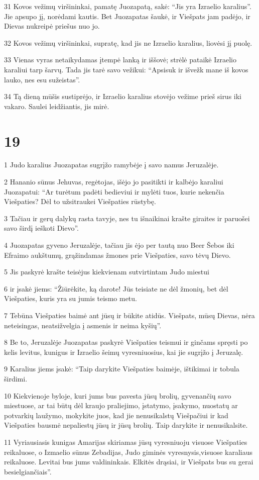 \par 31 Kovos vežimų viršininkai, pamatę Juozapatą, sakė: “Jis yra Izraelio karalius”. Jie apsupo jį, norėdami kautis. Bet Juozapatas šaukė, ir Viešpats jam padėjo, ir Dievas nukreipė priešus nuo jo. 
\par 32 Kovos vežimų viršininkai, supratę, kad jis ne Izraelio karalius, liovėsi jį puolę. 
\par 33 Vienas vyras netaikydamas įtempė lanką ir iššovė; strėlė pataikė Izraelio karaliui tarp šarvų. Tada jis tarė savo vežikui: “Apsisuk ir išvežk mane iš kovos lauko, nes esu sužeistas”. 
\par 34 Tą dieną mūšis sustiprėjo, ir Izraelio karalius stovėjo vežime prieš sirus iki vakaro. Saulei leidžiantis, jis mirė.



\chapter{19}


\par 1 Judo karalius Juozapatas sugrįžo ramybėje į savo namus Jeruzalėje. 
\par 2 Hananio sūnus Jehuvas, regėtojas, išėjo jo pasitikti ir kalbėjo karaliui Juozapatui: “Ar turėtum padėti bedieviui ir mylėti tuos, kurie nekenčia Viešpaties? Dėl to užsitraukei Viešpaties rūstybę. 
\par 3 Tačiau ir gerų dalykų rasta tavyje, nes tu išnaikinai krašte giraites ir paruošei savo širdį ieškoti Dievo”. 
\par 4 Juozapatas gyveno Jeruzalėje, tačiau jis ėjo per tautą nuo Beer Šebos iki Efraimo aukštumų, grąžindamas žmones prie Viešpaties, savo tėvų Dievo. 
\par 5 Jis paskyrė krašte teisėjus kiekvienam sutvirtintam Judo miestui 
\par 6 ir įsakė jiems: “Žiūrėkite, ką darote! Jūs teisiate ne dėl žmonių, bet dėl Viešpaties, kuris yra su jumis teismo metu. 
\par 7 Tebūna Viešpaties baimė ant jūsų ir būkite atidūs. Viešpats, mūsų Dievas, nėra neteisingas, neatsižvelgia į asmenis ir neima kyšių”. 
\par 8 Be to, Jeruzalėje Juozapatas paskyrė Viešpaties teismui ir ginčams spręsti po kelis levitus, kunigus ir Izraelio šeimų vyresniuosius, kai jie sugrįžo į Jeruzalę. 
\par 9 Karalius jiems įsakė: “Taip darykite Viešpaties baimėje, ištikimai ir tobula širdimi. 
\par 10 Kiekvienoje byloje, kuri jums bus pavesta jūsų brolių, gyvenančių savo miestuose, ar tai būtų dėl kraujo praliejimo, įstatymo, įsakymo, nuostatų ar potvarkių laužymo, mokykite juos, kad jie nenusikalstų Viešpačiui ir kad Viešpaties bausmė nepaliestų jūsų ir jūsų brolių. Taip darykite ir nenusikalsite. 
\par 11 Vyriausiasis kunigas Amarijas skiriamas jūsų vyresniuoju visuose Viešpaties reikaluose, o Izmaelio sūnus Zebadijas, Judo giminės vyresnysis,­visuose karaliaus reikaluose. Levitai bus jums valdininkais. Elkitės drąsiai, ir Viešpats bus su gerai besielgiančiais”.



